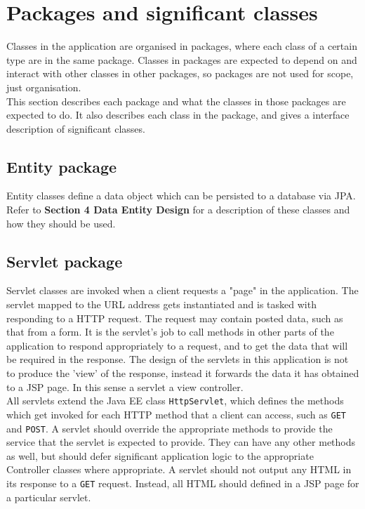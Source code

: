 \section{Packages and significant classes}
Classes in the application are organised in packages, where each class of a certain type are in the same package. Classes in packages are expected to depend on and interact with other classes in other packages, so packages are not used for scope, just organisation.\\

This section describes each package and what the classes in those packages are expected to do. It also describes each class in the package, and gives a interface description of significant classes.

\subsection{Entity package}
Entity classes define a data object which can be persisted to a database via JPA. Refer to \textbf{Section 4 Data Entity Design} for a description of these classes and how they should be used.

\subsection{Servlet package}
Servlet classes are invoked when a client requests a "page" in the application. The servlet mapped to the URL address gets instantiated and is tasked with responding to a HTTP request. The request may contain posted data, such as that from a form. It is the servlet's job to call methods in other parts of the application to respond appropriately to a request, and to get the data that will be required in the response. The design of the servlets in this application is not to produce the 'view' of the response, instead it forwards the data it has obtained to a JSP page. In this sense a servlet a view controller.\\

All servlets extend the Java EE class \texttt{HttpServlet}, which defines the methods which get invoked for each HTTP method that a client can access, such as \texttt{GET} and \texttt{POST}. A servlet should override the appropriate methods to provide the service that the servlet is expected to provide. They can have any other methods as well, but should defer significant application logic to the appropriate Controller classes where appropriate.
A servlet should not output any HTML in its response to a \texttt{GET} request. Instead, all HTML should defined in a JSP page for a particular servlet.\\

